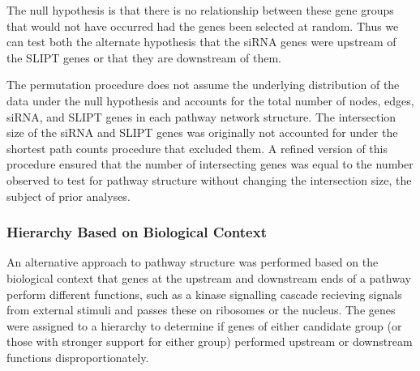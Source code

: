 The null hypothesis is that there is no relationship between these gene groups that would not have occurred had the genes been selected at random. Thus we can test both the alternate hypothesis that the \gls{siRNA} genes were upstream of the \gls{SLIPT} genes or that they are downstream of them.

The permutation procedure does not assume the underlying distribution of the data under the null hypothesis and accounts for the total number of nodes, edges, \gls{siRNA}, and \gls{SLIPT} genes in each pathway network structure. The intersection size of the \gls{siRNA} and \gls{SLIPT} genes was originally not accounted for under the shortest path counts procedure that excluded them. A refined version of this procedure ensured that the number of intersecting genes was equal to the number observed to test for pathway structure without changing the intersection size, the subject of prior analyses.

\subsubsection{Hierarchy Based on Biological Context} \label{methods:pathway_rank}
An alternative approach to pathway structure was performed based on the biological context that genes at the upstream and downstream ends of a pathway perform different functions, such as a kinase signalling cascade recieving signals from external stimuli and passes these on ribosomes or the nucleus. The genes were assigned to a hierarchy to determine if genes of either candidate group (or those with stronger support for either group) performed upstream or downstream functions disproportionately.

